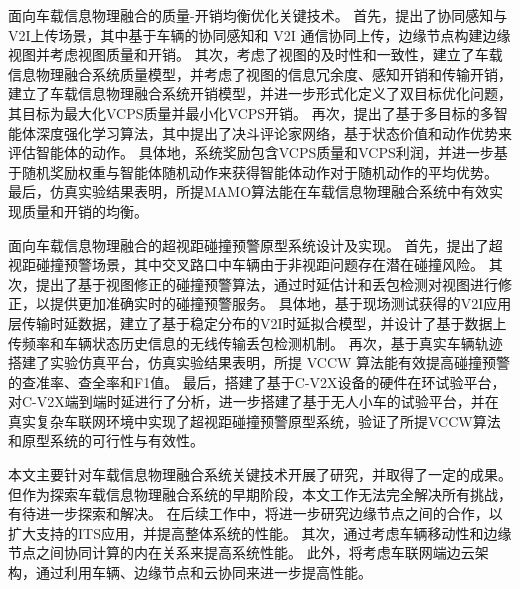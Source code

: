  面向车载信息物理融合的质量-开销均衡优化关键技术。
首先，提出了协同感知与V2I上传场景，其中基于车辆的协同感知和 V2I 通信协同上传，边缘节点构建边缘视图并考虑视图质量和开销。
其次，考虑了视图的及时性和一致性，建立了车载信息物理融合系统质量模型，并考虑了视图的信息冗余度、感知开销和传输开销，建立了车载信息物理融合系统开销模型，并进一步形式化定义了双目标优化问题，其目标为最大化VCPS质量并最小化VCPS开销。
再次，提出了基于多目标的多智能体深度强化学习算法，其中提出了决斗评论家网络，基于状态价值和动作优势来评估智能体的动作。
具体地，系统奖励包含VCPS质量和VCPS利润，并进一步基于随机奖励权重与智能体随机动作来获得智能体动作对于随机动作的平均优势。
最后，仿真实验结果表明，所提MAMO算法能在车载信息物理融合系统中有效实现质量和开销的均衡。

 面向车载信息物理融合的超视距碰撞预警原型系统设计及实现。
首先，提出了超视距碰撞预警场景，其中交叉路口中车辆由于非视距问题存在潜在碰撞风险。
其次，提出了基于视图修正的碰撞预警算法，通过时延估计和丢包检测对视图进行修正，以提供更加准确实时的碰撞预警服务。
具体地，基于现场测试获得的V2I应用层传输时延数据，建立了基于稳定分布的V2I时延拟合模型，并设计了基于数据上传频率和车辆状态历史信息的无线传输丢包检测机制。
再次，基于真实车辆轨迹搭建了实验仿真平台，仿真实验结果表明，所提 VCCW 算法能有效提高碰撞预警的查准率、查全率和F1值。
最后，搭建了基于C-V2X设备的硬件在环试验平台，对C-V2X端到端时延进行了分析，进一步搭建了基于无人小车的试验平台，并在真实复杂车联网环境中实现了超视距碰撞预警原型系统，验证了所提VCCW算法和原型系统的可行性与有效性。

本文主要针对车载信息物理融合系统关键技术开展了研究，并取得了一定的成果。
但作为探索车载信息物理融合系统的早期阶段，本文工作无法完全解决所有挑战，有待进一步探索和解决。
在后续工作中，将进一步研究边缘节点之间的合作，以扩大支持的ITS应用，并提高整体系统的性能。
其次，通过考虑车辆移动性和边缘节点之间协同计算的内在关系来提高系统性能。
此外，将考虑车联网端边云架构，通过利用车辆、边缘节点和云协同来进一步提高性能。
